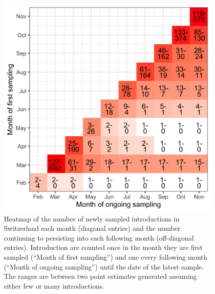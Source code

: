 \documentclass[9pt,twoside,lineno]{pnas-new}
\begin{document}
\begin{figure}[h!]
\centering
\includegraphics[width = 0.5\linewidth]{figures/chain_longevity_matrix.png}
\caption{Heatmap of the number of newly sampled introductions in Switzerland each month (diagonal entries) and the number continuing to persisting into each following month (off-diagonal entries). Introduction are counted once in the month they are first sampled (``Month of first sampling'') and one every following month (``Month of ongoing sampling'') until the date of the latest sample. The ranges are between two point estimates generated assuming either few or many introductions.}  
\label{fig:chain-longevity-matrix}
\end{figure}
\end{document}
